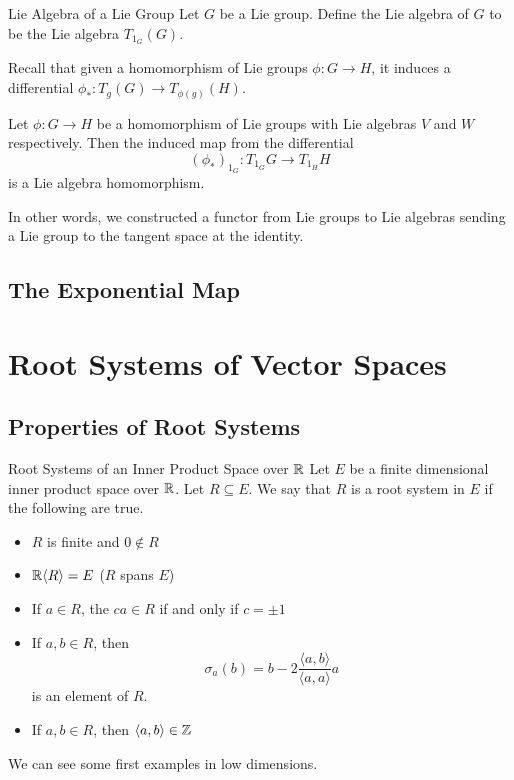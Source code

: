 \documentclass[a4paper]{article}
\begin{document}
\begin{defn}{Lie Algebra of a Lie Group}{} Let $G$ be a Lie group. Define the Lie algebra of $G$ to be the Lie algebra $T_{1_G}(G)$. 
\end{defn}

Recall that given a homomorphism of Lie groups $\phi:G\to H$, it induces a differential $\phi_\ast:T_g(G)\to T_{\phi(g)}(H)$. 

\begin{prp}{}{} Let $\phi:G\to H$ be a homomorphism of Lie groups with Lie algebras $V$ and $W$ respectively. Then the induced map from the differential $$(\phi_\ast)_{1_G}:T_{1_G}G\to T_{1_H}H$$ is a Lie algebra homomorphism. 
\end{prp}

In other words, we constructed a functor from Lie groups to Lie algebras sending a Lie group to the tangent space at the identity. 

\subsection{The Exponential Map}

\pagebreak
\section{Root Systems of Vector Spaces}
\subsection{Properties of Root Systems}
\begin{defn}{Root Systems of an Inner Product Space over $\mathbb{R}$}{} Let $E$ be a finite dimensional inner product space over $\mathbb{R}$. Let $R\subseteq E$. We say that $R$ is a root system in $E$ if the following are true. 
\begin{itemize}
\item $R$ is finite and $0\notin R$
\item $\mathbb{R}\langle R\rangle=E$ ($R$ spans $E$)
\item If $a\in R$, the $ca\in R$ if and only if $c=\pm1$
\item If $a,b\in R$, then $$\sigma_a(b)=b-2\frac{\langle a,b\rangle}{\langle a,a\rangle}a$$ is an element of $R$. 
\item If $a,b\in R$, then $\langle a,b\rangle\in\mathbb{Z}$
\end{itemize}
\end{defn}

We can see some first examples in low dimensions. \\
\end{document}
